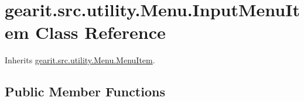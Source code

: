 \hypertarget{classgearit_1_1src_1_1utility_1_1_menu_1_1_input_menu_item}{\section{gearit.\+src.\+utility.\+Menu.\+Input\+Menu\+Item Class Reference}
\label{classgearit_1_1src_1_1utility_1_1_menu_1_1_input_menu_item}
}


Inherits \hyperlink{classgearit_1_1src_1_1utility_1_1_menu_1_1_menu_item}{gearit.\+src.\+utility.\+Menu.\+Menu\+Item}.

\subsection*{Public Member Functions}
